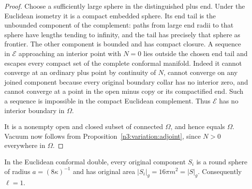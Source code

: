 \begin{proof}
Choose a sufficiently large sphere in the distinguished plus end.
Under the Euclidean isometry it is a compact embedded sphere. Its
end tail is the unbounded component of the complement: paths from
large end radii to that sphere have lengths tending to infinity,
and the tail has precisely that sphere as frontier. The other
component is bounded and has compact closure. A sequence in
$\mathcal E$ approaching an interior point with $N=0$ lies outside
the chosen end tail and escapes every compact set of the complete
conformal manifold. Indeed it cannot converge at an ordinary plus
point by continuity of $N$, cannot converge on any joined component
because every original boundary collar has no interior zero, and
cannot converge at a point in the open minus copy or its compactified
end. Such a sequence is impossible in the compact Euclidean
complement. Thus $\mathcal E$ has no interior boundary in $\Omega$.

It is a nonempty open and closed subset of connected $\Omega$, and
hence equals $\Omega$. Vacuum now follows from
Proposition~\ref{n3:variation:adjoint}, since $N>0$ everywhere in
$\Omega$.
\end{proof}

\begin{lemma}
\label{n3:static:one-boundary-component}
In the Euclidean conformal double, every original component $S_i$
is a round sphere of radius $a=(8\kappa)^{-1}$ and has original area
$|S_i|_g=16\pi m^2=|S|_g$. Consequently $\ell=1$.
\end{lemma}

